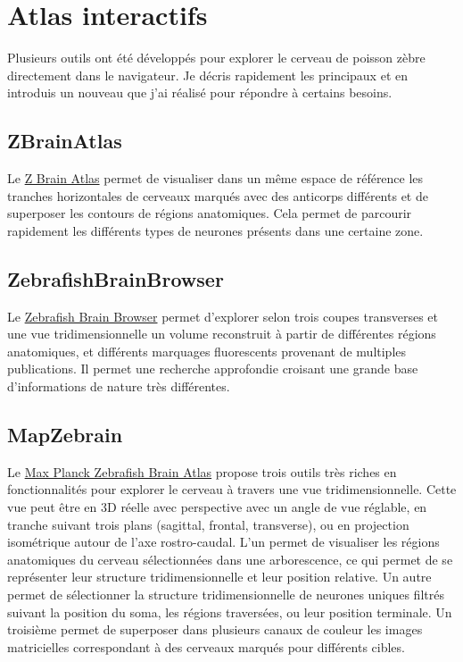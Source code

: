 \section{Atlas interactifs}

Plusieurs outils ont été développés pour explorer le cerveau de poisson zèbre directement dans le navigateur. Je décris rapidement les principaux et en introduis un nouveau que j'ai réalisé pour répondre à certains besoins.

\subsection{ZBrainAtlas}

Le \href{https://engertlab.fas.harvard.edu/Z-Brain/home/}{Z Brain Atlas} \cite{randlett_whole-brain_2015} permet de visualiser dans un même espace de référence les tranches horizontales de cerveaux marqués avec des anticorps différents et de superposer les contours de régions anatomiques. Cela permet de parcourir rapidement les différents types de neurones présents dans une certaine zone.

\subsection{ZebrafishBrainBrowser}

Le \href{http://zbbrowser.com}{Zebrafish Brain Browser} \cite{tabor_brain-wide_2019} permet d'explorer selon trois coupes transverses et une vue tridimensionnelle un volume reconstruit à partir de différentes régions anatomiques, et différents marquages fluorescents provenant de multiples publications. Il permet une recherche approfondie croisant une grande base d'informations de nature très différentes.

\subsection{MapZebrain}

Le \href{https://fishatlas.neuro.mpg.de/}{Max Planck Zebrafish Brain Atlas} \cite{kunst_cellular-resolution_2019} propose trois outils très riches en fonctionnalités pour explorer le cerveau à travers une vue tridimensionnelle. Cette vue peut être en 3D réelle avec perspective avec un angle de vue réglable, en tranche suivant trois plans (sagittal, frontal, transverse), ou en projection isométrique autour de l'axe rostro-caudal.
L'un permet de visualiser les régions anatomiques du cerveau sélectionnées dans une arborescence, ce qui permet de se représenter leur structure tridimensionnelle et leur position relative.
Un autre permet de sélectionner la structure tridimensionnelle de neurones uniques filtrés suivant la position du soma, les régions traversées, ou leur position terminale. Un troisième permet de superposer dans plusieurs canaux de couleur les images matricielles correspondant à des cerveaux marqués pour différents cibles.

